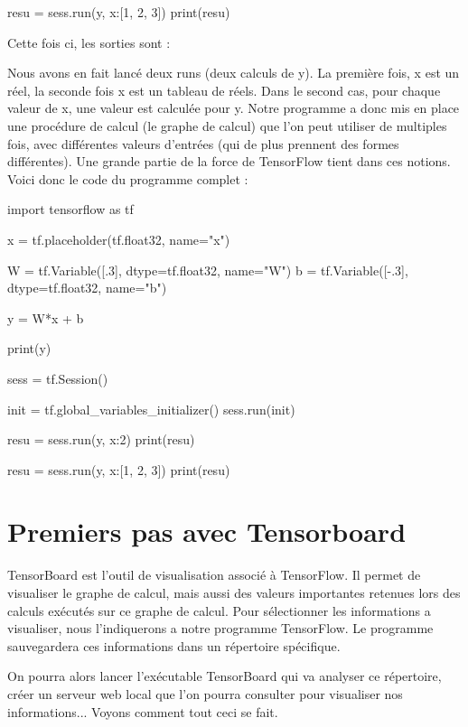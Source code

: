 \documentclass[a4paper,11pt]{book}
\theoremstyle{theo}
\begin{document}
\begin{mypython} 
resu = sess.run(y, {x:[1, 2, 3]}) 
print(resu)
\end{mypython} 

Cette fois ci, les sorties sont :

\begin{mypython} 
[0.3]
[0.  0.3 0.6]
\end{mypython} 

Nous avons en fait lancé deux runs (deux calculs de y). La première fois, x est un réel, la seconde fois x est un tableau de réels. Dans le second cas, pour chaque valeur de x, une valeur est calculée pour y.
Notre programme a donc mis en place une procédure de calcul (le graphe de calcul) que l'on peut utiliser de multiples fois, avec différentes valeurs d'entrées (qui de plus prennent des formes différentes).
Une grande partie de la force de TensorFlow tient dans ces notions.
Voici donc le code du programme complet :

\begin{mypython} 
import tensorflow as tf

x = tf.placeholder(tf.float32, name="x")

W = tf.Variable([.3], dtype=tf.float32, name="W")
b = tf.Variable([-.3], dtype=tf.float32, name="b")

y = W*x + b

print(y)

sess = tf.Session()

init = tf.global_variables_initializer()
sess.run(init)

resu = sess.run(y, {x:2}) 
print(resu)

resu = sess.run(y, {x:[1, 2, 3]}) 
print(resu)
\end{mypython} 

\section{Premiers pas avec Tensorboard}

TensorBoard est l'outil de visualisation associé à TensorFlow. Il permet de visualiser le graphe de calcul, mais aussi des valeurs importantes retenues lors des calculs exécutés sur ce graphe de calcul.
Pour sélectionner les informations a visualiser, nous l'indiquerons a notre programme TensorFlow. Le programme sauvegardera ces informations dans un répertoire spécifique.

On pourra alors lancer l'exécutable TensorBoard qui va analyser ce répertoire, créer un serveur web local que l'on pourra consulter pour visualiser nos informations...
Voyons comment tout ceci se fait.
\end{document}
